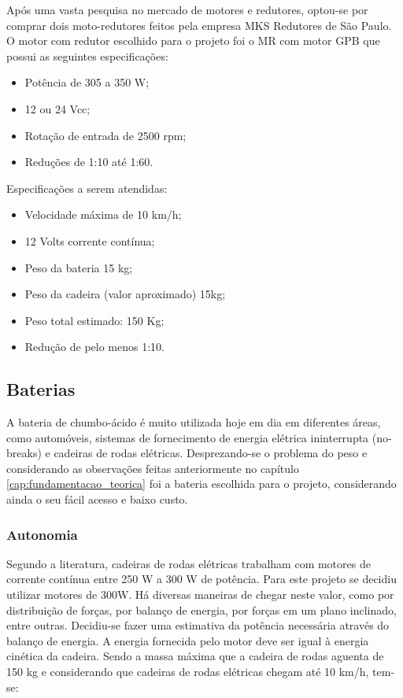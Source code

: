 Após uma vasta pesquisa no mercado de motores e redutores, optou-se por comprar dois moto-redutores feitos pela empresa MKS Redutores de São Paulo. O motor com redutor escolhido para o projeto foi o MR com motor GPB que possui as seguintes especificações:

\begin{itemize}
  \item Potência de 305 a 350 W;
  \item 12 ou 24 Vcc;
  \item Rotação de entrada de 2500 rpm;
  \item Reduções de 1:10 até 1:60.
\end{itemize}

Especificações a serem atendidas:

\begin{itemize}
  \item Velocidade máxima de 10 km/h;
  \item 12 Volts corrente contínua;
  \item Peso da bateria 15 kg;
  \item Peso da cadeira (valor aproximado) 15kg;
  \item Peso total estimado: 150 Kg;
  \item Redução de pelo menos 1:10.
\end{itemize}

\subsection{Baterias}

A bateria de chumbo-ácido é muito utilizada hoje em dia em diferentes áreas,  como automóveis, sistemas de fornecimento de energia elétrica ininterrupta (no-breaks) e cadeiras de rodas elétricas. Desprezando-se o problema do peso e considerando as observações feitas anteriormente no capítulo \ref{cap:fundamentacao_teorica} foi a bateria escolhida para o projeto, considerando ainda o seu fácil acesso e baixo  custo.

\subsubsection{Autonomia}

Segundo a literatura, cadeiras de rodas elétricas trabalham com motores de corrente contínua entre 250 W a 300 W de potência. Para este projeto se decidiu utilizar motores de 300W. Há diversas maneiras de chegar neste valor, como por distribuição de forças, por balanço de energia, por forças em um plano inclinado, entre outras. Decidiu-se fazer uma estimativa da potência necessária através do balanço de energia.
A energia fornecida pelo motor deve ser igual à energia cinética da cadeira. Sendo a massa máxima que a cadeira de rodas aguenta de 150 kg e considerando que cadeiras de rodas elétricas chegam até 10 km/h, tem-se:

